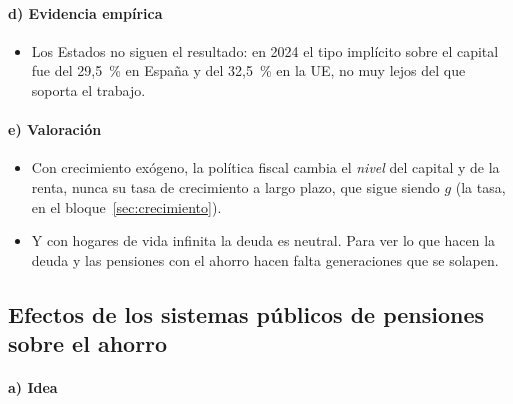 \documentclass[11pt]{article}
\begin{document}
\paragraph{d) Evidencia empírica}

\begin{itemize}
\item Los Estados no siguen el resultado: en 2024 el tipo implícito sobre el capital fue del 29,5~\% en España y del 32,5~\% en la UE, no muy lejos del que soporta el trabajo\nocite{CE2026ITRCapital,CE2026DataTaxation}.
\end{itemize}

\paragraph{e) Valoración}

\begin{itemize}
\item Con crecimiento exógeno, la política fiscal cambia el \emph{nivel} del capital y de la renta, nunca su tasa de crecimiento a largo plazo, que sigue siendo $g$ (la tasa, en el bloque~\ref{sec:crecimiento}).
\item Y con hogares de vida infinita la deuda es neutral. Para ver lo que hacen la deuda y las pensiones con el ahorro hacen falta generaciones que se solapen.
\end{itemize}

\subsection{Efectos de los sistemas públicos de pensiones sobre el ahorro}\label{sec:pensiones}

\paragraph{a) Idea}
\end{document}
